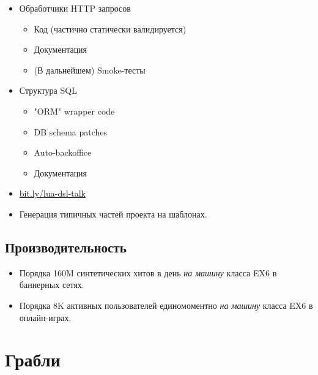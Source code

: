 \documentclass[aspectratio=169,handout,bigger]{beamer}
\begin{document}
\begin{frame}
  \begin{itemize}
    \item Обработчики HTTP запросов
    \begin{itemize}
      \item Код (частично статически валидируется)
      \item Документация
      \item (В дальнейшем) Smoke-тесты
    \end{itemize}
    \item Структура SQL
    \begin{itemize}
      \item "ORM" wrapper code
      \item DB schema patches
      \item Auto-backoffice
      \item Документация
    \end{itemize}
    \item \url{bit.ly/lua-dsl-talk}
    \item Генерация типичных частей проекта на шаблонах.
  \end{itemize}
\end{frame}


\subsection*{Производительность}

\begin{frame}
  \begin{itemize}
    \item Порядка 160M синтетических хитов в день \emph{на машину} класса EX6 в баннерных сетях.
    \item Порядка 8K активных пользователей единомоментно \emph{на машину} класса EX6 в онлайн-играх.
  \end{itemize}
\end{frame}


\section{Грабли}

\end{document}
